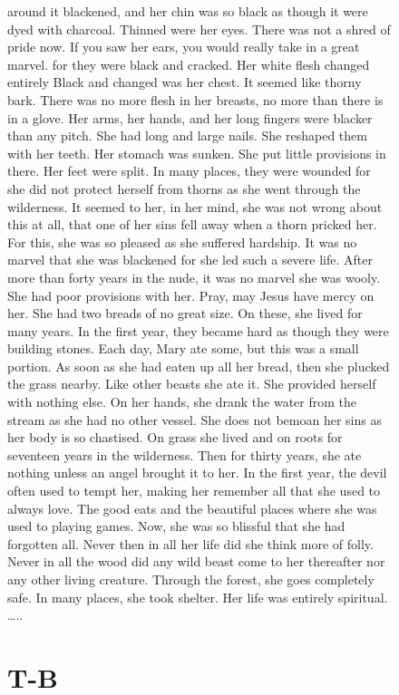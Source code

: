 \documentclass[
  letterpaper,
  DIV=11,
  numbers=noendperiod,
  oneside]{scrreprt}
\begin{document}
\begin{figure}
around it blackened, and her chin was so black as though it were dyed
with charcoal. Thinned were her eyes. There was not a shred of pride
now. If you saw her ears, you would really take in a great marvel. for
they were black and cracked. Her white flesh changed entirely Black and
changed was her chest. It seemed like thorny bark. There was no more
flesh in her breasts, no more than there is in a glove. Her arms, her
hands, and her long fingers were blacker than any pitch. She had long
and large nails. She reshaped them with her teeth. Her stomach was
sunken. She put little provisions in there. Her feet were split. In many
places, they were wounded for she did not protect herself from thorns as
she went through the wilderness. It seemed to her, in her mind, she was
not wrong about this at all, that one of her sins fell away when a thorn
pricked her. For this, she was so pleased as she suffered hardship. It
was no marvel that she was blackened for she led such a severe life.
After more than forty years in the nude, it was no marvel she was wooly.
She had poor provisions with her. Pray, may Jesus have mercy on her. She
had two breads of no great size. On these, she lived for many years. In
the first year, they became hard as though they were building stones.
Each day, Mary ate some, but this was a small portion. As soon as she
had eaten up all her bread, then she plucked the grass nearby. Like
other beasts she ate it. She provided herself with nothing else. On her
hands, she drank the water from the stream as she had no other vessel.
She does not bemoan her sins as her body is so chastised. On grass she
lived and on roots for seventeen years in the wilderness. Then for
thirty years, she ate nothing unless an angel brought it to her. In the
first year, the devil often used to tempt her, making her remember all
that she used to always love. The good eats and the beautiful places
where she was used to playing games. Now, she was so blissful that she
had forgotten all. Never then in all her life did she think more of
folly. Never in all the wood did any wild beast come to her thereafter
nor any other living creature. Through the forest, she goes completely
safe. In many places, she took shelter. Her life was entirely spiritual.
\ldots..

\section{T-B}\label{t-b}


\end{figure}
\end{document}
